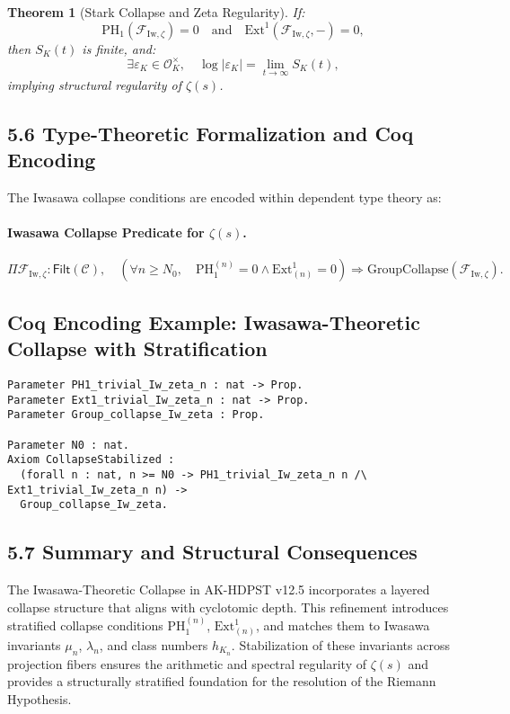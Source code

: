 \documentclass[11pt]{article}
\newtheorem{theorem}{Theorem}[section]
\begin{document}
\begin{theorem}[Stark Collapse and Zeta Regularity]
If:
\[
\mathrm{PH}_1(\mathcal{F}_{\mathrm{Iw}, \zeta}) = 0 \quad \text{and} \quad \mathrm{Ext}^1(\mathcal{F}_{\mathrm{Iw}, \zeta}, -) = 0,
\]
then $S_K(t)$ is finite, and:
\[
\exists \varepsilon_K \in \mathcal{O}_K^\times, \quad \log |\varepsilon_K| = \lim_{t \to \infty} S_K(t),
\]
implying structural regularity of $\zeta(s)$.
\end{theorem}

\subsection*{5.6 Type-Theoretic Formalization and Coq Encoding}

The Iwasawa collapse conditions are encoded within dependent type theory as:

\paragraph{Iwasawa Collapse Predicate for $\zeta(s)$.}
\[
\Pi \mathcal{F}_{\mathrm{Iw}, \zeta} : \mathsf{Filt}(\mathcal{C}), \quad 
\left( \forall n \geq N_0, \quad \mathrm{PH}_1^{(n)} = 0 \wedge \mathrm{Ext}^1_{(n)} = 0 \right) 
\Rightarrow \mathrm{GroupCollapse}(\mathcal{F}_{\mathrm{Iw}, \zeta}).
\]

\subsection*{Coq Encoding Example: Iwasawa-Theoretic Collapse with Stratification}

\begin{lstlisting}[language=Coq, caption=Iwasawa-Theoretic Stratified Collapse, captionpos=b]
Parameter PH1_trivial_Iw_zeta_n : nat -> Prop.
Parameter Ext1_trivial_Iw_zeta_n : nat -> Prop.
Parameter Group_collapse_Iw_zeta : Prop.

Parameter N0 : nat.
Axiom CollapseStabilized :
  (forall n : nat, n >= N0 -> PH1_trivial_Iw_zeta_n n /\ Ext1_trivial_Iw_zeta_n n) ->
  Group_collapse_Iw_zeta.
\end{lstlisting}

\subsection*{5.7 Summary and Structural Consequences}

The Iwasawa-Theoretic Collapse in AK-HDPST v12.5 incorporates a layered collapse structure that aligns with cyclotomic depth. This refinement introduces stratified collapse conditions $\mathrm{PH}_1^{(n)}$, $\mathrm{Ext}^1_{(n)}$, and matches them to Iwasawa invariants $\mu_n$, $\lambda_n$, and class numbers $h_{K_n}$. Stabilization of these invariants across projection fibers ensures the arithmetic and spectral regularity of $\zeta(s)$ and provides a structurally stratified foundation for the resolution of the Riemann Hypothesis.
\end{document}
